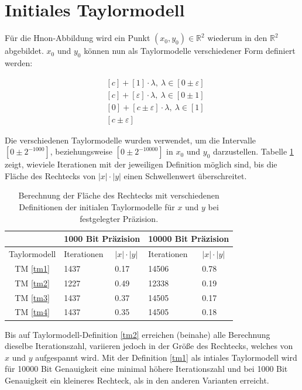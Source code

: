  \section{Initiales Taylormodell}
 
 Für die H\e non-Abbildung wird ein Punkt $(x_0,y_0) \in \mathbb{R}^2$ wiederum in den $\mathbb{R}^2$ abgebildet. $x_0$ und $y_0$ können nun als Taylormodelle verschiedener Form definiert werden:
 
 
 \begin{align}
  &[c] + [1] \cdot \lambda,\  \lambda \in [0 \pm \varepsilon] \label{tm1}\\
  &[c] + [\varepsilon] \cdot \lambda,\ \lambda \in [0 \pm 1] \label{tm2}\\
  &[0] + [c \pm \varepsilon] \cdot \lambda,\ \lambda \in [1] \label{tm3}\\
  &[c \pm \varepsilon]\label{tm4} 
 \end{align}


Die verschiedenen Taylormodelle wurden verwendet, um die Intervalle $[0 \pm 2^{-1000}]$, beziehungsweise $[0\pm 2^{-10000}]$ in $x_0$ und $y_0$ darzustellen. Tabelle \ref{tab:tm} zeigt, wieviele Iterationen mit der jeweiligen Definition möglich sind, bis die Fläche des Rechtecks von $|x|\cdot|y|$ einen Schwellenwert überschreitet.
 
 
\begin{table}[tbh]
\centering
\begin{tabular}{|c||l|l||l|l|}
\hline
&\multicolumn{2}{c||}{1000 Bit Präzision} & \multicolumn{2}{c|}{10000 Bit Präzision} \\
\hline
Taylormodell & Iterationen & $|x| \cdot |y|$ &Iterationen & $|x| \cdot |y|$\\
\hline
TM \ref{tm1} & 1437 & 0.17 &14506 & 0.78 \\ 
TM \ref{tm2}  & 1227 & 0.49&12338 & 0.19  \\
TM \ref{tm3} & 1437 &  0.37&14505 & 0.17  \\                                                                 
TM \ref{tm4}  & 1437 & 0.35 &14505 & 0.18  \\
\hline 
\end{tabular}

\caption[Experimentelle Taylormodell Varianten]{Berechnung der Fläche des Rechtecks mit verschiedenen Definitionen der initialen Taylormodelle für $x$ und $y$ bei festgelegter Präzision.}
\label{tab:tm}
\end{table}
 
 
Bis auf Taylormodell-Definition \ref{tm2} erreichen (beinahe) alle Berechnung dieselbe Iterationszahl, variieren jedoch in der Größe des Rechtecks, welches von $x$ und $y$ aufgespannt wird. Mit der Definition \ref{tm1} als intiales Taylormodell wird für 10000 Bit Genauigkeit eine minimal höhere Iterationszahl und bei 1000 Bit Genauigkeit ein kleineres Rechteck, als in den anderen Varianten erreicht.
 

